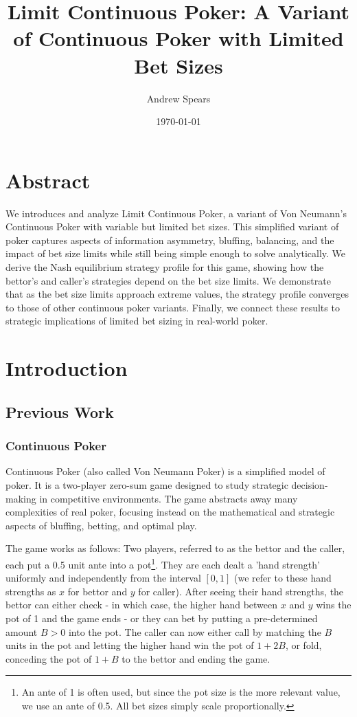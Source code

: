 \documentclass[a4paper,12pt]{article}
\title{Limit Continuous Poker: A Variant of Continuous Poker with Limited Bet Sizes}
\author{Andrew Spears}
\date{\today}
\theoremstyle{plain}
\theoremstyle{definition}
\begin{document}
\maketitle

\section{Abstract}
We introduces and analyze Limit Continuous Poker, a variant of Von Neumann's Continuous Poker with variable but limited bet sizes. This simplified variant of poker captures aspects of information asymmetry, bluffing, balancing, and the impact of bet size limits while still being simple enough to solve analytically. We derive the Nash equilibrium strategy profile for this game, showing how the bettor's and caller's strategies depend on the bet size limits. We demonstrate that as the bet size limits approach extreme values, the strategy profile converges to those of other continuous poker variants. Finally, we connect these results to strategic implications of limited bet sizing in real-world poker.

\section{Introduction}

\subsection{Previous Work}

\subsubsection{Continuous Poker}
Continuous Poker (also called Von Neumann Poker) is a simplified model of poker. It is a two-player zero-sum game designed to study strategic decision-making in competitive environments. The game abstracts away many complexities of real poker, focusing instead on the mathematical and strategic aspects of bluffing, betting, and optimal play.

The game works as follows: Two players, referred to as the bettor and the caller, each put a 0.5 unit ante into a pot\footnote{An ante of 1 is often used, but since the pot size is the more relevant value, we use an ante of 0.5. All bet sizes simply scale proportionally.}. They are each dealt a 'hand strength' uniformly and independently from the interval $[0, 1]$ (we refer to these hand strengths as $x$ for bettor and $y$ for caller). After seeing their hand strengths, the bettor can either check - in which case, the higher hand between $x$ and $y$ wins the pot of 1 and the game ends - or they can bet by putting a pre-determined amount $B > 0$ into the pot. The caller can now either call by matching the $B$ units in the pot and letting the higher hand win the pot of $1+2B$, or fold, conceding the pot of $1+B$ to the bettor and ending the game.
\end{document}

